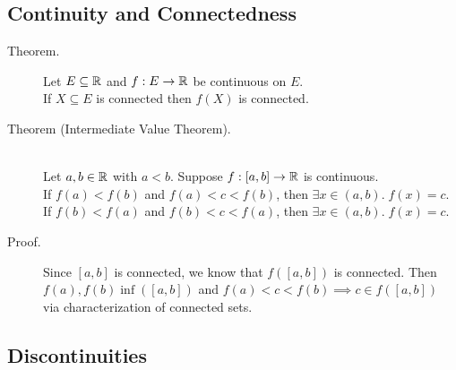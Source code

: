 \documentclass[letterpaper,11pt]{article}
\begin{document}
\subsection{Continuity and Connectedness}
\begin{description}
\item[Theorem.] Let $E\subseteq\mathbb{R}$ and $f:E\to\mathbb{R}$ be continuous on $E$.\\
    If $X\subseteq E$ is connected then $f(X)$ is connected.


\item[Theorem (Intermediate Value Theorem).]\mbox{}\\
  Let $a,b\in\mathbb{R}$ with $a<b$. Suppose $f:[a,b]\to\mathbb{R}$ is continuous.\\
  If $f(a)<f(b)$ and $f(a)<c<f(b)$, then $\exists x\in(a,b).\;f(x)=c$.\\
  If $f(b)<f(a)$ and $f(b)<c<f(a)$, then $\exists x\in(a,b).\;f(x)=c$.

\item[Proof.] Since $[a,b]$ is connected, we know that $f([a,b])$ is connected.
  Then $f(a),f(b)\inf([a,b])$ and $f(a)<c<f(b)\implies c\in f([a,b])$
  via characterization of connected sets.
\end{description}


\subsection{Discontinuities}
\end{document}

